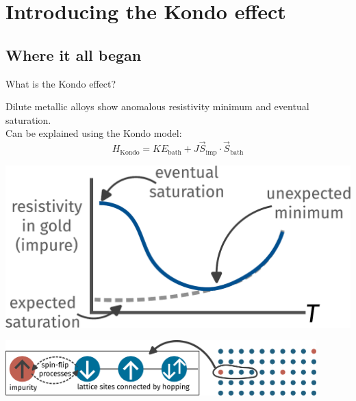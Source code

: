 \documentclass[10pt,aspectratio=169]{beamer}
\begin{document}
\section{Introducing the Kondo effect}
\subsection{Where it all began}

\begin{frame}{What is the Kondo effect?}
\begin{minipage}{0.5\textwidth}
Dilute metallic alloys show anomalous resistivity \alert{minimum} and eventual saturation.\\[10pt]
Can be explained using the \alert{Kondo model}:
\[H_\text{Kondo} = KE_\text{bath} + J \vec{S}_\text{imp}\cdot\vec{S}_\text{bath}\]
\end{minipage}
\hspace*{\fill}
\begin{minipage}{0.45\textwidth}
\centering
\includegraphics[width=\textwidth]{resistance_minimum.pdf}
\end{minipage}

\begin{center}
\includegraphics[width=0.9\textwidth]{KondoModel.pdf}
\end{center}


\end{frame}
\end{document}
